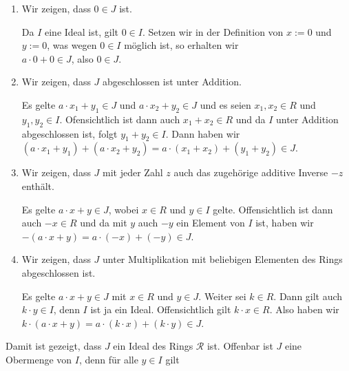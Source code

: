 \begin{enumerate}
\item Wir zeigen, dass $0 \in J$ ist.
 
      Da $I$ eine Ideal ist, gilt $0 \in I$.  Setzen wir in der Definition von
      $x := 0$ und $y := 0$, was wegen $0 \in I$ m\"{o}glich ist, so erhalten wir
      \\[0.2cm]
      \hspace*{1.3cm}
      $a \cdot 0 + 0 \in J$, \quad also \quad $0 \in J$.
      {\color{green}{\checkmark}}
\item Wir zeigen, dass $J$ abgeschlossen ist unter Addition.

      Es gelte $a \cdot x_1 + y_1 \in J$ und $a \cdot x_2 + y_2 \in J$ und es seien
      $x_1,x_2 \in R$ und $y_1,y_2 \in I$.  Ofensichtlich ist dann auch $x_1 + x_2 \in R$ und
      da $I$ unter Addition abgeschlossen ist, folgt $y_1 + y_2 \in I$.  Dann haben wir
      \\[0.2cm]
      \hspace*{1.3cm}
      $(a \cdot x_1 + y_1) + (a \cdot x_2 + y_2) = a \cdot (x_1 + x_2) + (y_1 + y_2) \in J$.
      {\color{green}{\checkmark}}
\item Wir zeigen, dass $J$ mit jeder Zahl $z$ auch das zugeh\"{o}rige additive Inverse $-z$ enth\"{a}lt.

      Es gelte $a \cdot x + y \in J$, wobei
      $x \in R$ und $y \in I$ gelte.  Offensichtlich ist dann auch $-x \in R$ und
      da mit $y$ auch $-y$ ein Element von $I$ ist, haben wir
      \\[0.2cm]
      \hspace*{1.3cm}
      $-(a \cdot x + y) = a \cdot (-x) + (-y) \in J$.
      {\color{green}{\checkmark}}
\item Wir zeigen, dass $J$ unter Multiplikation mit beliebigen Elementen des Rings abgeschlossen ist.

      Es gelte $a \cdot x + y \in J$ mit $x \in R$ und $y \in J$.  Weiter sei $k \in R$.
      Dann gilt auch $k \cdot y \in I$, denn $I$ ist ja ein Ideal. Offensichtlich gilt $k \cdot x \in R$.
      Also haben wir
      \\[0.2cm]
      \hspace*{1.3cm}
      $k \cdot (a \cdot x + y) = a \cdot (k \cdot x) + (k \cdot y) \in J$.
      {\color{green}{\checkmark}}
\end{enumerate}
Damit ist gezeigt, dass $J$ ein Ideal des Rings $\mathcal{R}$ ist.
Offenbar ist $J$ eine Obermenge von $I$, denn f\"{u}r alle $y \in I$ gilt
